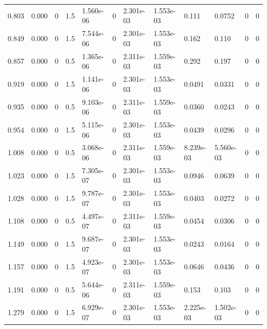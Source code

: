 \documentclass[preview]{standalone}
\begin{document}
{{\begin{tabular}{L{1.2cm}C{1.2cm} C{0.3cm}C{0.5cm} C{1.4cm}C{1.4cm} C{1.4cm}C{1.4cm} C{1.6cm}C{1.6cm} C{1.6cm}C{1.6cm}}
  0.803  &  0.000  & 0     & 1.5 &  1.560e-06  & 0  &  2.301e-03&   1.553e-03& 0.111 & 0.0752   &  0 & 0  \\ 
  0.849  &  0.000  & 0     & 1.5 &  7.544e-06  & 0  &  2.301e-03&   1.553e-03& 0.162 & 0.110   &  0 & 0  \\ 
  0.857  &  0.000  & 0     & 0.5 &  1.365e-06  & 0  &  2.311e-03&   1.559e-03& 0.292 & 0.197   &  0 & 0  \\ 
  0.919  &  0.000  & 0     & 1.5 &  1.141e-06  & 0  &  2.301e-03&   1.553e-03& 0.0491 & 0.0331   &  0 & 0  \\ 
  0.935  &  0.000  & 0     & 0.5 &  9.103e-06  & 0  &  2.311e-03&   1.559e-03& 0.0360 & 0.0243   &  0 & 0  \\ 
  0.954  &  0.000  & 0     & 1.5 &  5.115e-06  & 0  &  2.301e-03&   1.553e-03& 0.0439 & 0.0296   &  0 & 0  \\ 
  1.008  &  0.000  & 0     & 0.5 &  3.068e-06  & 0  &  2.311e-03&   1.559e-03& 8.239e-03 & 5.560e-03   &  0 & 0  \\ 
  1.023  &  0.000  & 0     & 1.5 &  7.305e-07  & 0  &  2.301e-03&   1.553e-03& 0.0946 & 0.0639   &  0 & 0  \\ 
  1.028  &  0.000  & 0     & 1.5 &  9.787e-07  & 0  &  2.301e-03&   1.553e-03& 0.0403 & 0.0272   &  0 & 0  \\ 
  1.108  &  0.000  & 0     & 0.5 &  4.497e-07  & 0  &  2.311e-03&   1.559e-03& 0.0454 & 0.0306   &  0 & 0  \\ 
  1.149  &  0.000  & 0     & 1.5 &  9.687e-07  & 0  &  2.301e-03&   1.553e-03& 0.0243 & 0.0164   &  0 & 0  \\ 
  1.157  &  0.000  & 0     & 1.5 &  4.923e-07  & 0  &  2.301e-03&   1.553e-03& 0.0646 & 0.0436   &  0 & 0  \\ 
  1.191  &  0.000  & 0     & 0.5 &  5.644e-06  & 0  &  2.311e-03&   1.559e-03& 0.153 & 0.103   &  0 & 0  \\ 
  1.279  &  0.000  & 0     & 1.5 &  6.929e-07  & 0  &  2.301e-03&   1.553e-03& 2.225e-03 & 1.502e-03   &  0 & 0  \\ 
\hline 
\end{tabular} 

}}
\end{document}
